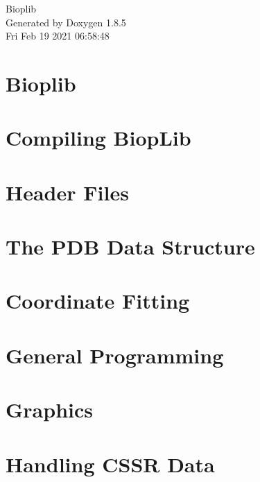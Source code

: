 \documentclass[twoside]{book}
\newcommand{\clearemptydoublepage}{%
  \newpage{\pagestyle{empty}\cleardoublepage}%
}
\begin{document}
\hypersetup{pageanchor=false}
\begin{titlepage}
\vspace*{7cm}
\begin{center}%
{\Large Bioplib }\\
\vspace*{1cm}
{\large Generated by Doxygen 1.8.5}\\
\vspace*{0.5cm}
{\small Fri Feb 19 2021 06:58:48}\\
\end{center}
\end{titlepage}
\clearemptydoublepage
\tableofcontents
\clearemptydoublepage
{}
\hypersetup{pageanchor=true}

\chapter{Bioplib}
\label{index}\hypertarget{index}{}
\chapter{Compiling Biop\-Lib}
\label{page_01}
\hypertarget{page_01}{}

\chapter{Header Files}
\label{page_02}
\hypertarget{page_02}{}

\chapter{The P\-D\-B Data Structure}
\label{page_03}
\hypertarget{page_03}{}

\chapter{Coordinate Fitting}
\label{page_04}
\hypertarget{page_04}{}

\chapter{General Programming}
\label{page_05}
\hypertarget{page_05}{}

\chapter{Graphics}
\label{page_06}
\hypertarget{page_06}{}

\chapter{Handling C\-S\-S\-R Data}
\label{page_07}
\hypertarget{page_07}{}

\end{document}
